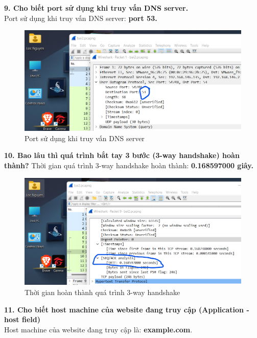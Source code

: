 \textbf{9.	Cho biết port sử dụng khi truy vấn DNS server.}\\
Port sử dụng khi truy vấn DNS server: \textbf{port 53.}
\begin{figure}[H]
\begin{center}
\includegraphics[scale=1]{../figures/p2/p2_dnsport}
\end{center}
\caption{Port sử dụng khi truy vấn DNS server}
\end{figure}

\textbf{10. Bao lâu thì quá trình bắt tay 3 bước (3-way handshake) hoàn thành?}
Thời gian quá trình 3-way handshake hoàn thành: \textbf{0.168597000 giây.}
\begin{figure}[H]
\begin{center}
\includegraphics[scale=1]{../figures/p2/p2_handshake}
\end{center}
\caption{Thời gian hoàn thành quá trình 3-way handshake}
\end{figure}

\textbf{11.	 Cho biết host machine của website đang truy cập (Application - host field)}\\
Host machine của website đang truy cập là: \textbf{example.com}.

